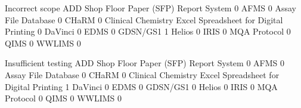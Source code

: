 \documentclass{article}
\begin{document}
\begin{Schunk}
\begin{Soutput}
                                                            Incorrect scope
  ADD Shop Floor Paper (SFP) Report System                                0
  AFMS                                                                    0
  Assay File Database                                                     0
  CHaRM                                                                   0
  Clinical Chemistry Excel Spreadsheet for Digital Printing               0
  DaVinci                                                                 0
  EDMS                                                                    0
  GDSN/GS1                                                                1
  Helios                                                                  0
  IRIS                                                                    0
  MQA Protocol                                                            0
  QIMS                                                                    0
  WWLIMS                                                                  0
                                                           
                                                            Insufficient testing
  ADD Shop Floor Paper (SFP) Report System                                     0
  AFMS                                                                         0
  Assay File Database                                                          0
  CHaRM                                                                        0
  Clinical Chemistry Excel Spreadsheet for Digital Printing                    1
  DaVinci                                                                      0
  EDMS                                                                         0
  GDSN/GS1                                                                     0
  Helios                                                                       0
  IRIS                                                                         0
  MQA Protocol                                                                 0
  QIMS                                                                         0
  WWLIMS                                                                       0
                                                           

\end{Soutput}
\end{Schunk}
\end{document}
